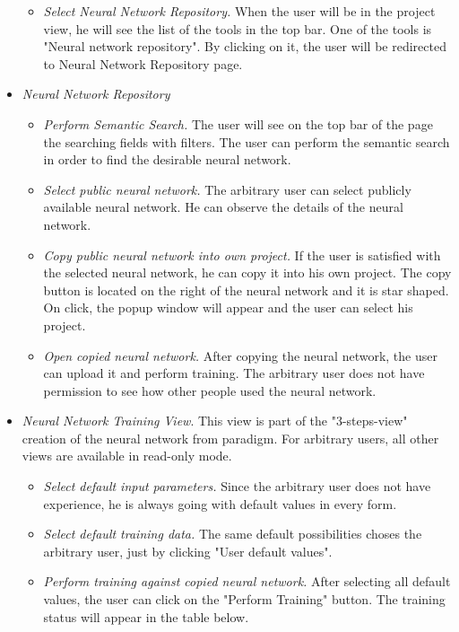 \begin{itemize}
\begin{itemize}
\item \emph{Select Neural Network Repository.} When the user will be in the project view, he will see the list of the tools in the top bar. One of the tools is "Neural network repository". By clicking on it, the user will be redirected to Neural Network Repository page.
\end{itemize}
\item \emph{Neural Network Repository}
\begin{itemize}
\item \emph{Perform Semantic Search.} The user will see on the top bar of the page the searching fields with filters. The user can perform the semantic search in order to find the desirable neural network. 
\item \emph{Select public neural network.} The arbitrary user can select publicly available neural network. He can observe the details of the neural network.
\item \emph{Copy public neural network into own project.} If the user is satisfied with the selected neural network, he can copy it into his own project. The copy button is located on the right of the neural network and it is star shaped. On click, the popup window will appear and the user can select his project.
\item \emph{Open copied neural network.} After copying the neural network, the user can upload it and perform training. The arbitrary user does not have permission to see how other people used the neural network.
\end{itemize}

\item \emph{Neural Network Training View}. This view is part of the "3-steps-view" creation of the neural network from paradigm. For arbitrary users, all other views are available in read-only mode.
\begin{itemize}
\item \emph{Select default input parameters.} Since the arbitrary user does not have experience, he is always going with default values in every form.
\item \emph{Select default training data.} The same default possibilities choses the arbitrary user, just by clicking "User default values".
\item \emph{Perform training against copied neural network.} After selecting all default values, the user can click on the "Perform Training" button. The training status will appear in the table below.
\end{itemize}


\end{itemize}
